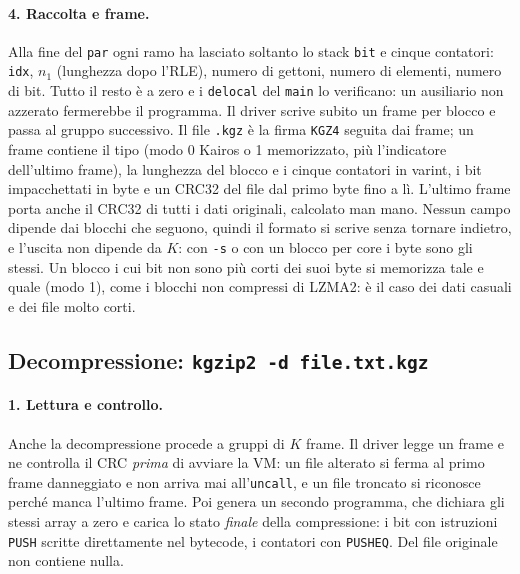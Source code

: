 \documentclass[11pt,a4paper]{article}
\newcommand{\kw}[1]{\texttt{#1}}
\begin{document}
\paragraph{4. Raccolta e frame.} Alla fine del \kw{par} ogni ramo ha lasciato soltanto lo stack \kw{bit} e cinque contatori: \kw{idx}, $n_1$ (lunghezza dopo l'RLE), numero di gettoni, numero di elementi, numero di bit. Tutto il resto è a zero e i \kw{delocal} del \kw{main} lo verificano: un ausiliario non azzerato fermerebbe il programma. Il driver scrive subito un frame per blocco e passa al gruppo successivo. Il file \kw{.kgz} è la firma \kw{KGZ4} seguita dai frame; un frame contiene il tipo (modo 0 Kairos o 1 memorizzato, più l'indicatore dell'ultimo frame), la lunghezza del blocco e i cinque contatori in varint, i bit impacchettati in byte e un CRC32 del file dal primo byte fino a lì. L'ultimo frame porta anche il CRC32 di tutti i dati originali, calcolato man mano. Nessun campo dipende dai blocchi che seguono, quindi il formato si scrive senza tornare indietro, e l'uscita non dipende da $K$: con \kw{-s} o con un blocco per core i byte sono gli stessi. Un blocco i cui bit non sono più corti dei suoi byte si memorizza tale e quale (modo 1), come i blocchi non compressi di LZMA2: è il caso dei dati casuali e dei file molto corti.

\subsection{Decompressione: \texttt{kgzip2 -d file.txt.kgz}}

\paragraph{1. Lettura e controllo.} Anche la decompressione procede a gruppi di $K$ frame. Il driver legge un frame e ne controlla il CRC \emph{prima} di avviare la VM: un file alterato si ferma al primo frame danneggiato e non arriva mai all'\kw{uncall}, e un file troncato si riconosce perché manca l'ultimo frame. Poi genera un secondo programma, che dichiara gli stessi array a zero e carica lo stato \emph{finale} della compressione: i bit con istruzioni \kw{PUSH} scritte direttamente nel bytecode, i contatori con \kw{PUSHEQ}. Del file originale non contiene nulla.
\end{document}
